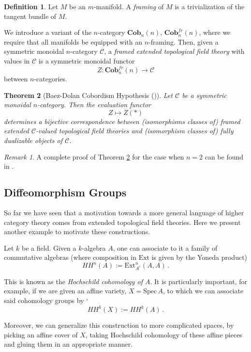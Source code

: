 \documentclass[a4paper,11pt]{article}
\newcommand{\spec}{\mathrm{Spec}\,}
\newcommand{\ccal}{\mathcal{C}}
\newcommand{\ext}{\mathrm{Ext}}
\theoremstyle{plain}
\newtheorem{thm}{Theorem}[section]
\theoremstyle{definition}
\newtheorem{defi}[thm]{Definition}
\theoremstyle{remark}
\newtheorem*{rem}{Remark}
\begin{document}
\begin{defi}
Let $M$ be an $m$-manifold. A \textit{framing} of $M$ is a trivialization of the tangent bundle of $M$. 
\end{defi}

We introduce a variant of the $n$-category $\textbf{Cob}_n(n)$, $\textbf{Cob}^{fr}_n(n)$, where we require that all manifolds be equipped with an $n$-framing. Then, given a symmetric monoidal $n$-category $\ccal$, a \textit{framed extended topological field theory} with values in $\ccal$ is a symmetric monoidal functor 
$$Z \colon \textbf{Cob}^{fr}_n(n) \to \ccal$$
between $n$-categories. 


\begin{thm}[Baez-Dolan Cobordism Hypothesis (\cite{baez})]
\label{baez_dolan}
Let $\ccal$ be a symmetric monoidal $n$-category. Then the evaluation functor 
$$Z \mapsto Z(*)$$
determines a bijective correspondence between (isomorphisms classes of) framed extended $\ccal$-valued topological field theories and (isomorphism classes of) fully dualizable objects of $\ccal$. 
\end{thm}

\begin{rem}
A complete proof of Theorem \ref{baez_dolan} for the case when $n = 2$ can be found in \cite{chris}.
\end{rem}

\subsection{Diffeomorphism Groups}
\label{diffeomorphism_groups}

So far we have seen that a motivation towards a more general language of higher category theory comes from extended topological field theories. Here we present another example to motivate these constructions. 


Let $k$ be a field. Given a $k$-algebra $A$, one can associate to it a family of commutative algebras (where composition in $\ext$ is given by the Yoneda product)
$$HH^n(A) := \ext_{A^e}^n(A, A) \, .$$

This is known as the \textit{Hochschild cohomology of $A$}. It is particularly important, for example, if we are given an affine variety, $X = \spec A$, to which we can associate said cohomology groups by `
$$HH^k(X) := HH^k(A) \, .$$

Moreover, we can generalize this construction to more complicated spaces, by picking an affine cover of $X$, taking Hochschild cohomology of these affine pieces and gluing them in an appropriate manner. 
\end{document}
